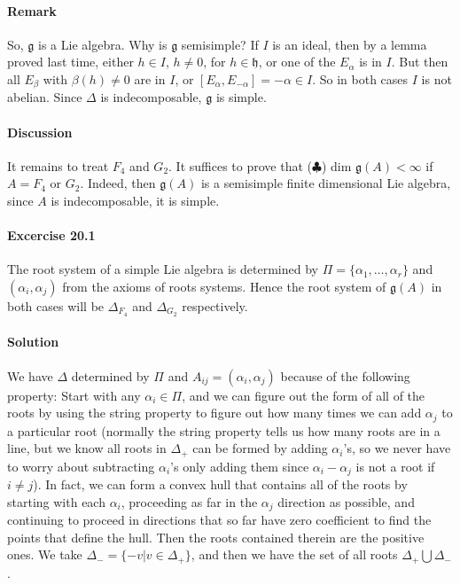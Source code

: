 \documentclass[11pt]{article}
\newcommand{\g}{\ensuremath{\mathfrak{g}}}
\newcommand{\h}{\ensuremath{\mathfrak{h}}}
\begin{document}
\paragraph{Remark}
So, $\g$ is a Lie algebra. Why is $\g$ semisimple? If $I$ is an ideal, then
by a lemma proved last time, either $h \in I$, $h \neq 0$, for $h \in \h$, 
or one of the $E_{\alpha}$ is in $I$. But then all $E_{\beta}$ with
$\beta(h) \neq 0$ are in $I$, or $[E_{\alpha},E_{-\alpha}]=-\alpha \in I$.
So in both cases $I$ is not abelian. Since $\Delta$ is indecomposable,
$\g$ is simple.

\paragraph{Discussion}
It remains to treat $F_4$ and $G_2$. It suffices to prove that ($\clubsuit$) dim $\g(A)
< \infty$ if $A = F_4$ or $G_2$. Indeed, then $\g(A)$ is a semisimple finite
dimensional Lie algebra, since $A$ is indecomposable, it is simple.

\paragraph{Excercise 20.1}
The root system of a simple Lie algebra is determined by $\Pi=\{\alpha_1,
\dots,\alpha_r\}$ and $(\alpha_i,\alpha_j)$ from the axioms of roots systems.
Hence the root system of $\g(A)$ in both cases will be $\Delta_{F_4}$ and
$\Delta_{G_2}$ respectively.

\paragraph{Solution}
We have $\Delta$ determined by $\Pi$ and $A_{i j} = (\alpha_i,\alpha_j)$ because of the following property: Start with any $\alpha_i \in \Pi$, and we can figure out the form of all of the roots by using the string property to figure out how many times we can add $\alpha_j$ to a particular root (normally the string property tells us how many roots are in a line, but we know all roots in $\Delta_+$ can be formed by adding $\alpha_i$'s, so we never have to worry about subtracting $\alpha_i$'s only adding them since $\alpha_i - \alpha_j$ is not a root if $i \ne j$).  In fact, we can form a convex hull that contains all of the roots by starting with each $\alpha_i$, proceeding as far in the $\alpha_j$ direction as possible, and continuing to proceed in directions that so far have zero coefficient to find the points that define the hull.  Then the roots contained therein are the positive ones.  We take $\Delta_- = \{-v | v \in \Delta_+\}$, and then we have the set of all roots $\Delta_+ \bigcup \Delta_-$.
\end{document}
